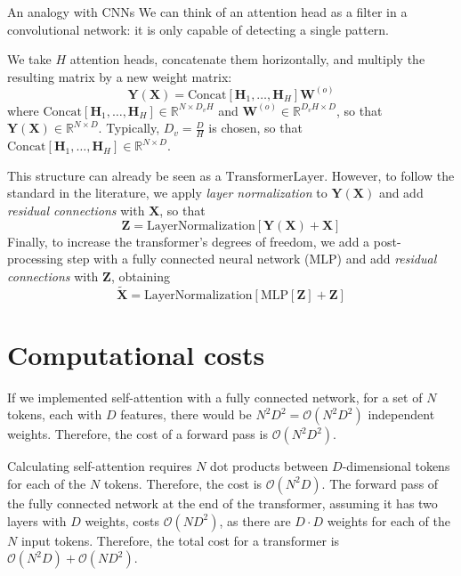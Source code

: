 \begin{note}{An analogy with CNNs}
    We can think of an attention head as a filter in a convolutional network: it is only capable of detecting a single pattern.
\end{note}

We take $H$ attention heads, concatenate them horizontally, and multiply the resulting matrix by a new weight matrix:
\[
\mathbf{Y}(\mathbf{X}) = \text{Concat}\left[\mathbf{H}_{1}, \ldots, \mathbf{H}_{H}\right]\mathbf{W}^{(o)}
\]
where $\text{Concat}\left[\mathbf{H}_{1}, \ldots, \mathbf{H}_{H}\right] \in \mathbb{R}^{N \times D_v H}$ and $\mathbf{W}^{(o)} \in \mathbb{R}^{D_v H \times D}$, so that $\mathbf{Y}(\mathbf{X}) \in \mathbb{R}^{N \times D}$. Typically, $D_v = \frac{D}{H}$ is chosen, so that $\text{Concat}\left[\mathbf{H}_{1}, \ldots, \mathbf{H}_{H}\right] \in \mathbb{R}^{N \times D}$.

This structure can already be seen as a $\text{TransformerLayer}$. However, to follow the standard in the literature, we apply \textit{layer normalization} to $\mathbf{Y}(\mathbf{X})$ and add \textit{residual connections} with $\mathbf{X}$, so that
\[
\mathbf{Z}=\text{LayerNormalization}\left[\mathbf{Y}(\mathbf{X})+\mathbf{X}\right]
\]
Finally, to increase the transformer's degrees of freedom, we add a post-processing step with a fully connected neural network ($\text{MLP}$) and add \textit{residual connections} with $\mathbf{Z}$, obtaining
\[
\tilde{\mathbf{X}}=\text{LayerNormalization}\left[\text{MLP}\left[\mathbf{Z}\right] + \mathbf{Z}\right]
\]

\section{Computational costs}
If we implemented self-attention with a fully connected network, for a set of $N$ tokens, each with $D$ features, there would be $N^2 D^2 = \mathcal{O}(N^2 D^2)$ independent weights. Therefore, the cost of a forward pass is $\mathcal{O}(N^2 D^2)$.

Calculating self-attention requires $N$ dot products between $D$-dimensional tokens for each of the $N$ tokens. Therefore, the cost is $\mathcal{O}(N^2 D)$. The forward pass of the fully connected network at the end of the transformer, assuming it has two layers with $D$ weights, costs $\mathcal{O}(N D^2)$, as there are $D \cdot D$ weights for each of the $N$ input tokens. Therefore, the total cost for a transformer is $\mathcal{O}(N^2 D) + \mathcal{O}(N D^2)$.

